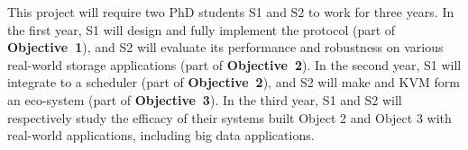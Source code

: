This project will require two PhD students S1 and S2 to work for 
three years. In the first year, S1 will design and fully implement the \falcon 
protocol (part of \textbf{Objective~1}), and S2 will evaluate its performance 
and robustness on various real-world storage applications (part of 
\textbf{Objective~2}). In the second year, S1 will 
integrate \falcon to a scheduler \mesos (part of \textbf{Objective~2}), and S2 
will make \falcon and KVM form an eco-system (part of \textbf{Objective~3}). In 
the third year, S1 and S2 will respectively study the efficacy of their systems 
built Object 2 and Object 3 with real-world applications, including big data 
applications.


